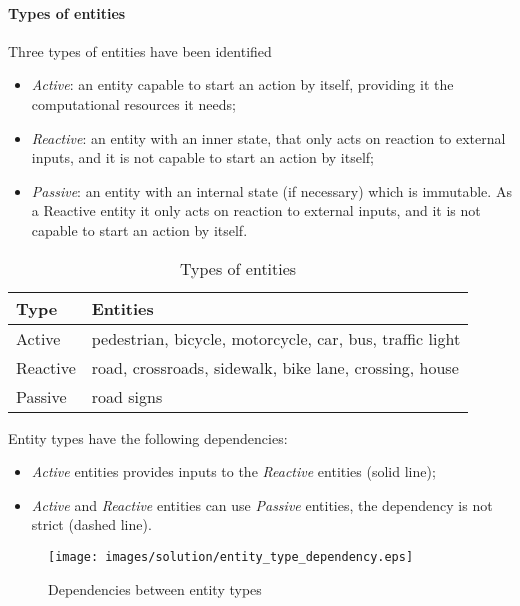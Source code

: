 \paragraph{Types of entities}
Three types of entities have been identified
\begin{itemize}
  \item \textit{Active}: an entity capable to start an action by itself, 
  providing it the computational resources it needs;
  \item \textit{Reactive}: an entity with an inner state, that only acts on 
reaction to external inputs, and it is not capable to start an action by itself;
  \item \textit{Passive}: an entity with an internal state (if necessary) which 
is immutable. As a Reactive entity it only acts on reaction to external inputs, 
and it is not capable to start an action by itself.
\end{itemize}
\begin{table}[H]
\centering
\begin{tabular}{|l|l|}
\hline
\rowcolor{BlueGreen}
Type     & Entities                                 \\ \hline
Active   & pedestrian, bicycle, motorcycle, car, bus, traffic light \\ \hline
Reactive & road, crossroads, sidewalk, bike lane, crossing, house \\ \hline
Passive  & road signs                               \\ \hline
\end{tabular}
\caption{Types of entities}
\label{tab:entity_type}
\end{table}
Entity types have the following dependencies:
\begin{itemize}
  \item \textit{Active} entities provides inputs to the \textit{Reactive} 
entities (solid line);
  \item \textit{Active} and \textit{Reactive} entities can use \textit{Passive} 
entities, the dependency is not strict (dashed line).
\end{itemize}
\begin{figure}[H]
  \centering
  \texttt{[image: images/solution/entity\_type\_dependency.eps]}
  \caption{Dependencies between entity types}
  \label{fig:sd-entity-types-deps}
\end{figure}
